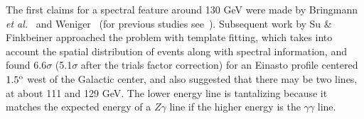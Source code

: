 \documentclass[aps,prd,superscriptaddress,showpacs,nofootinbib,fixlfloat, 12pt]{revtex4-1}
\newcommand{\Fermi}{{\slshape Fermi}}
\newcommand{\degree}{^{\rm o}}
\begin{document}
 
The first claims for a spectral feature around 130 GeV were made by Bringmann
\textit{et al.}~\citep{Bringmann:2012} and Weniger~\citep{Weniger:2012} (for
previous studies see~\cite{Pullen:2006sy, Abdo:2010nc, Vertongen:2011mu,
Ackermann:2012qk}). Subsequent work by Su \& Finkbeiner approached the problem
with template fitting, which takes into account the spatial distribution of
events along with spectral information, and found 6.6$\sigma$ (5.1$\sigma$
after the trials factor correction) for an Einasto profile centered
$1.5\degree$ west of the Galactic center, and also suggested that there may
be two lines, at about 111 and 129 GeV. The lower energy line is
tantalizing because it matches the expected energy of a $Z\gamma$ line if
the higher energy is the $\gamma\gamma$ line.  

 
\end{document}

